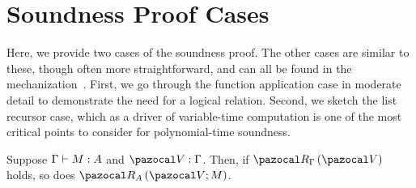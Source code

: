 \section{Soundness Proof Cases}
\label{app:soundness}

Here, we provide two cases of the soundness proof. The other cases are similar to these, though often more straightforward, and can all be found in the mechanization~\cite{mechanization}. First, we go through the function application case in moderate detail to demonstrate the need for a logical relation. Second, we sketch the list recursor case, which as a driver of variable-time computation is one of the most critical points to consider for polynomial-time soundness.
\begin{theorem}
Suppose $\Gamma \vdash M : A$ and $\envtypes{\env}{\Gamma}$. Then, if $\Renv{\Gamma}{\env}$ holds, so does $\Rterm{A}{\env}{M}$.
\end{theorem}
